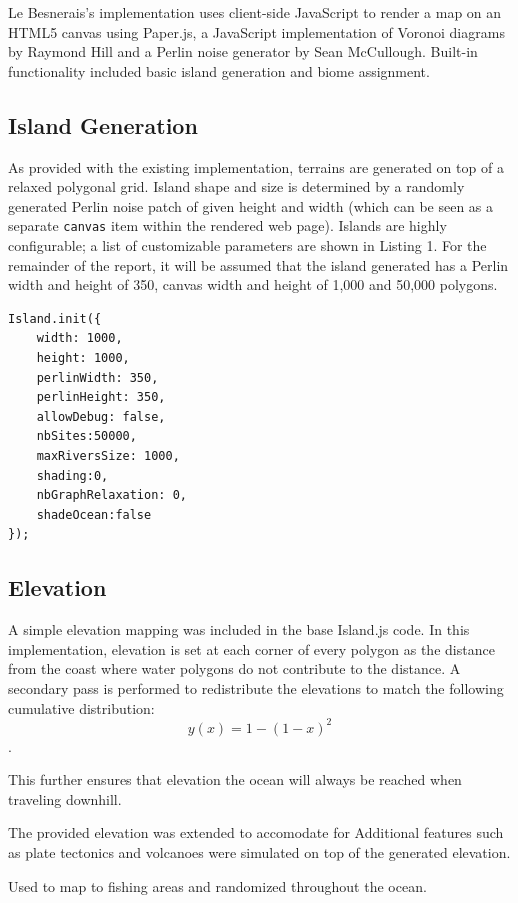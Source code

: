Le Besnerais's implementation uses client-side JavaScript to render a map on an HTML5 canvas using Paper.js\cite{Lehni:2015:Online}, a JavaScript implementation of Voronoi diagrams by Raymond Hill \cite{Hill:2015:Online} and a Perlin noise generator by Sean McCullough\cite{McCullough:2015:Online}. Built-in functionality included basic island generation and biome assignment. 

\subsection{Island Generation}
As provided with the existing implementation, terrains are generated on top of a relaxed polygonal grid. Island shape and size is determined by a randomly generated Perlin noise patch of given height and width (which can be seen as a separate \texttt{canvas} item within the rendered web page). Islands are highly configurable; a list of customizable parameters are shown in Listing 1. For the remainder of the report, it will be assumed that the island generated has a Perlin width and height of 350, canvas width and height of 1,000 and 50,000 polygons.

\begin{lstlisting}[caption=Island Parameters]
Island.init({
	width: 1000,
	height: 1000,
    perlinWidth: 350,
    perlinHeight: 350,
    allowDebug: false,
    nbSites:50000,
    maxRiversSize: 1000,
    shading:0,
    nbGraphRelaxation: 0,
    shadeOcean:false
});
\end{lstlisting}

\subsection{Elevation}
A simple elevation mapping was included in the base Island.js code. In this implementation, elevation is set at each corner of every polygon as the distance from the coast where water polygons do not contribute to the distance. A secondary pass is performed to redistribute the elevations to match the following cumulative distribution: $$y(x) = 1 - (1-x)^2$$. 

This further ensures that elevation the ocean will always be reached when traveling downhill.

The provided elevation was extended to accomodate for 
Additional features such as plate tectonics and volcanoes were simulated on top of the generated elevation. 

Used to map to fishing areas and randomized throughout the ocean.

